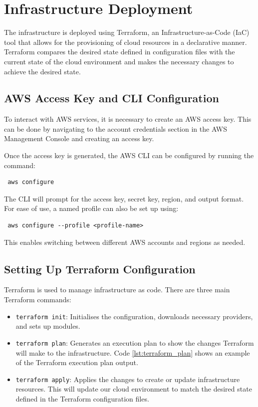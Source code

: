 \section{Infrastructure Deployment}
The infrastructure is deployed using Terraform, an Infrastructure-as-Code (IaC) tool that allows for the provisioning of cloud resources in a declarative manner. Terraform compares the desired state defined in configuration files with the current state of the cloud environment and makes the necessary changes to achieve the desired state.

\subsection{AWS Access Key and CLI Configuration}
To interact with AWS services, it is necessary to create an AWS access key. This can be done by navigating to the account credentials section in the AWS Management Console and creating an access key.

Once the access key is generated, the AWS CLI can be configured by running the command:
\begin{verbatim}
 aws configure
\end{verbatim}
The CLI will prompt for the access key, secret key, region, and output format. For ease of use, a named profile can also be set up using:
\begin{verbatim}
 aws configure --profile <profile-name>
\end{verbatim}
This enables switching between different AWS accounts and regions as needed.

\subsection{Setting Up Terraform Configuration}
Terraform is used to manage infrastructure as code. There are three main Terraform commands:
\begin{itemize}
    \item \texttt{terraform init}: Initialises the configuration, downloads necessary providers, and sets up modules.
    \item \texttt{terraform plan}: Generates an execution plan to show the changes Terraform will make to the infrastructure. Code \ref{lst:terraform_plan} shows an example of the Terraform execution plan output.
    \item \texttt{terraform apply}: Applies the changes to create or update infrastructure resources. This will update our cloud environment to match the desired state defined in the Terraform configuration files.
\end{itemize}

